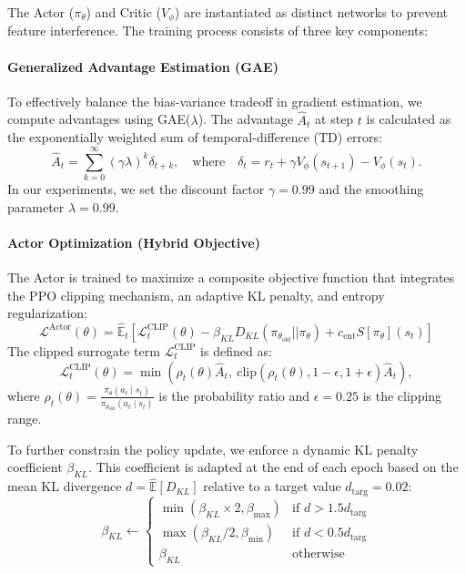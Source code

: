 \documentclass[letterpaper]{article} %
\begin{document}
The Actor ($\pi_{\theta}$) and Critic ($V_{\phi}$) are instantiated as distinct networks to prevent feature interference. The training process consists of three key components:

\paragraph{Generalized Advantage Estimation (GAE)}
To effectively balance the bias-variance tradeoff in gradient estimation, we compute advantages using GAE($\lambda$). The advantage $\hat{A}_t$ at step $t$ is calculated as the exponentially weighted sum of temporal-difference (TD) errors:
\begin{equation}
    \hat{A}_t = \sum_{k=0}^{\infty} (\gamma \lambda)^k \delta_{t+k}, \quad \text{where} \quad \delta_t = r_t + \gamma V_{\phi}(s_{t+1}) - V_{\phi}(s_t).
\end{equation}
In our experiments, we set the discount factor $\gamma=0.99$ and the smoothing parameter $\lambda=0.99$.

\paragraph{Actor Optimization (Hybrid Objective)}
The Actor is trained to maximize a composite objective function that integrates the PPO clipping mechanism, an adaptive KL penalty, and entropy regularization:
\begin{equation}
    \mathcal{L}^{\text{Actor}}(\theta) = \hat{\mathbb{E}}_t \left[ \mathcal{L}^{\text{CLIP}}_t(\theta) - \beta_{KL} D_{KL}(\pi_{\theta_{\text{old}}} || \pi_{\theta}) + c_\text{ent} S[\pi_{\theta}](s_t) \right]
\end{equation}
The clipped surrogate term $\mathcal{L}^{\text{CLIP}}_t$ is defined as:
\begin{equation}
    \mathcal{L}^{\text{CLIP}}_t(\theta) = \min \left( \rho_t(\theta) \hat{A}_t, \ \text{clip}(\rho_t(\theta), 1 - \epsilon, 1 + \epsilon) \hat{A}_t \right),
\end{equation}
where $\rho_t(\theta) = \frac{\pi_{\theta}(a_t \mid s_t)}{\pi_{\theta_{\text{old}}}(a_t \mid s_t)}$ is the probability ratio and $\epsilon=0.25$ is the clipping range.

To further constrain the policy update, we enforce a dynamic KL penalty coefficient $\beta_{KL}$. This coefficient is adapted at the end of each epoch based on the mean KL divergence $d = \hat{\mathbb{E}}[D_{KL}]$ relative to a target value $d_{\text{targ}} = 0.02$:
\begin{equation}
    \beta_{KL} \leftarrow 
    \begin{cases} 
      \min(\beta_{KL} \times 2, \beta_{\max}) & \text{if } d > 1.5 d_{\text{targ}} \\
      \max(\beta_{KL} / 2, \beta_{\min}) & \text{if } d < 0.5 d_{\text{targ}} \\
      \beta_{KL} & \text{otherwise}
    \end{cases}
\end{equation}
\end{document}
